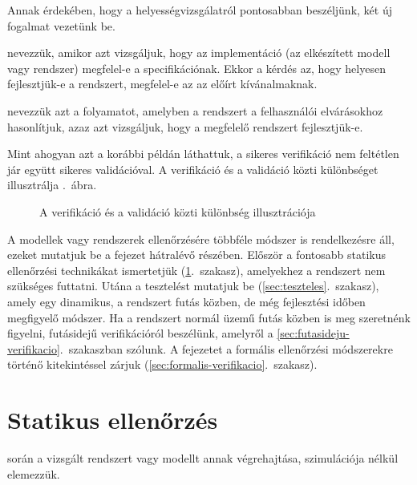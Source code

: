 Annak érdekében, hogy a helyességvizsgálatról pontosabban beszéljünk, két új fogalmat vezetünk be.

\begin{definicio}
 nevezzük, amikor azt vizsgáljuk, hogy az implementáció (az elkészített modell vagy rendszer) megfelel-e a specifikációnak. Ekkor a kérdés az, hogy helyesen fejlesztjük-e a rendszert, megfelel-e az az előírt kívánalmaknak.
\end{definicio}
\begin{definicio}
 nevezzük azt a folyamatot, amelyben a rendszert a felhasználói elvárásokhoz hasonlítjuk, azaz azt vizsgáljuk, hogy a megfelelő rendszert fejlesztjük-e.
\end{definicio}

Mint ahogyan azt a korábbi példán láthattuk, a sikeres verifikáció nem feltétlen jár együtt sikeres validációval. A verifikáció és a validáció közti különbséget illusztrálja .~ábra.

\begin{figure}[h]
	\centering
	

	\caption{A verifikáció és a validáció közti különbség illusztrációja}
	\label{fig:verifikacio_vs_validacio}
\end{figure}

A modellek vagy rendszerek ellenőrzésére többféle módszer is rendelkezésre áll, ezeket mutatjuk be a fejezet hátralévő részében. Először a fontosabb statikus ellenőrzési technikákat ismertetjük (\ref{sec:statikus-ellenorzes}.~szakasz), amelyekhez a rendszert nem szükséges futtatni. Utána a tesztelést mutatjuk be (\ref{sec:teszteles}.~szakasz), amely egy dinamikus, a rendszert futás közben, de még fejlesztési időben megfigyelő módszer. Ha a rendszert normál üzemű futás közben is meg szeretnénk figyelni, futásidejű verifikációról beszélünk, amelyről a \ref{sec:futasideju-verifikacio}.~szakaszban szólunk. A fejezetet a formális ellenőrzési módszerekre történő kitekintéssel zárjuk (\ref{sec:formalis-verifikacio}.~szakasz).



\section{Statikus ellenőrzés}\label{sec:statikus-ellenorzes}

\begin{definicio}
 során a vizsgált rendszert vagy modellt annak végrehajtása, szimulációja nélkül elemezzük.
\end{definicio}

